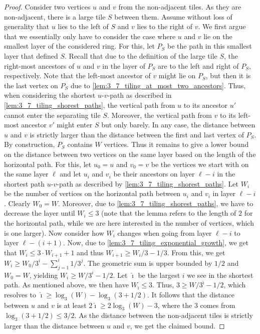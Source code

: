 \begin{proof}
    Consider two vertices $u$ and $v$ from the non-adjacent tiles.
    As they are non-adjacent, there is a large tile $S$ between them.
    Assume without loss of generality that $u$ lies to the left of $S$ and $v$ lies to the right of $v$.
    We first argue that we essentially only have to consider the case where $u$ and $v$ lie on the smallest layer of the considered ring.
    For this, let $P_S$ be the path in this smallest layer that defined $S$.
    Recall that due to the definition of the large tile $S$, the right-most ancestors of $u$ and $v$ in the layer of $P_S$ are to the left and right of $P_S$, respectively.
    Note that the left-most ancestor of $v$ might lie on $P_S$, but then it is the last vertex on $P_S$ due to \cref{lem:3_7_tiling_at_most_two_ancestors}.
%
    Thus, when considering the shortest $u$-$v$-path as described in \cref{lem:3_7_tiling_shorest_paths}, the vertical path from $u$ to its ancestor $u'$ cannot enter the separating tile $S$.
    Moreover, the vertical path from $v$ to its left-most ancestor $v'$ might enter $S$ but only barely.
    In any case, the distance between $u$ and $v$ is strictly larger than the distance between the first and last vertex of $P_S$.
    By construction, $P_S$ contains $W$ vertices.
    Thus it remains to give a lower bound on the distance between two vertices on the same layer based on the length of the horizontal path.
%
    For this, let $u_0 = u$ and $v_0 = v$ be the vertices we start with on the same layer $\ell$ and let $u_i$ and $v_i$ be their ancestors on layer $\ell - i$ in the shortest path $u$-$v$-path as described by \cref{lem:3_7_tiling_shorest_paths}.
    Let $W_i$ be the number of vertices on the horizontal path between $u_i$ and $v_i$ in layer $\ell - i$.
    Clearly $W_0 = W$.
    Moreover, due to \cref{lem:3_7_tiling_shorest_paths}, we have to decrease the layer until $W_i \le 3$ (note that the lemma refers to the length of $2$ for the horizontal path, while we are here interested in the number of vertices, which is one larger).
    Now consider how $W_i$ changes when going from layer $\ell - i$ to layer $\ell - (i + 1)$.
    Now, due to \cref{lem:3_7_tiling_exponential_growth}, we get that $W_i \le 3 \cdot W_{i + 1} + 1$ and thus $W_{i + 1} \ge W_i / 3 - 1/3$.
    From this, we get $W_i \ge W_0 / 3^i - \sum_{j = 1}^i 1/3^j$.
    The geometric sum is upper bounded by $1/2$ and $W_0 = W$, yielding $W_i \ge W / 3^i - 1/2$.
    Let $\hat\imath$ be the largest $i$ we see in the shortest path.
    As mentioned above, we then have $W_{\hat\imath} \le 3$.
    Thus, $3 \ge W / 3^{\hat\imath} - 1/2$, which resolves to $\hat\imath \ge \log_3(W) - \log_3(3 + 1/2)$.
    It follows that the distance between $u$ and $v$ is at least $2\hat\imath \ge 2 \log_3(W) - 3$, where the $3$ comes from $\log_3(3 + 1/2) \le 3/2$.  As the distance between the non-adjacent tiles is strictly larger than the distance between $u$ and $v$, we get the claimed bound. 
\end{proof}
